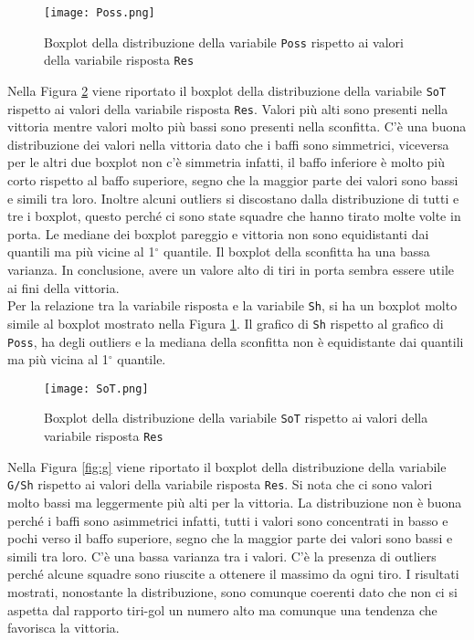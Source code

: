 \begin{figure}[htbp]
	\begin{center}
		\texttt{[image: Poss.png]}
		\caption{Boxplot della distribuzione della variabile \texttt{Poss} rispetto ai valori della variabile risposta \texttt{Res}} \label{fig:Poss}
	\end{center}
\end{figure}

Nella Figura \ref{fig:sot} viene riportato il boxplot della distribuzione della variabile \texttt{SoT} rispetto ai valori della variabile risposta \texttt{Res}. Valori più alti sono presenti nella vittoria mentre valori molto più bassi sono presenti nella sconfitta. C'è una buona distribuzione dei valori nella vittoria dato che i baffi sono simmetrici, viceversa per le altri due boxplot non c'è simmetria infatti, il baffo inferiore è molto più corto rispetto al baffo superiore, segno che la maggior parte dei valori sono bassi e simili tra loro. Inoltre alcuni outliers si discostano dalla distribuzione di tutti e tre i boxplot, questo perché ci sono state squadre che hanno tirato molte volte in porta. Le mediane dei boxplot pareggio e vittoria non sono equidistanti dai quantili ma più vicine al 1$^{\circ}$ quantile. Il boxplot della sconfitta ha una bassa varianza. In conclusione, avere un valore alto di tiri in porta sembra essere utile ai fini della vittoria.\\

Per la relazione tra la variabile risposta e la variabile \texttt{Sh}, si ha un boxplot molto simile al boxplot mostrato nella Figura \ref{fig:Poss}. Il grafico di \texttt{Sh} rispetto al grafico di \texttt{Poss}, ha degli outliers e la mediana della sconfitta non è equidistante dai quantili ma più vicina al 1$^{\circ}$ quantile.\\

\begin{figure}[htbp]
	\begin{center}
		\texttt{[image: SoT.png]}
		\caption{Boxplot della distribuzione della variabile \texttt{SoT} rispetto ai valori della variabile risposta \texttt{Res} } \label{fig:sot}
	\end{center}
\end{figure}

Nella Figura \ref{fig:g} viene riportato il boxplot della distribuzione della variabile \texttt{G/Sh} rispetto ai valori della variabile risposta \texttt{Res}. Si nota che ci sono valori molto bassi ma leggermente più alti per la vittoria. La distribuzione non è buona perché i baffi sono asimmetrici infatti, tutti i valori sono concentrati in basso e pochi verso il baffo superiore, segno che la maggior parte dei valori sono bassi e simili tra loro. C'è una bassa varianza tra i valori. C'è la presenza di outliers perché alcune squadre sono riuscite a ottenere il massimo da ogni tiro. I risultati mostrati, nonostante la distribuzione, sono comunque coerenti dato che non ci si aspetta dal rapporto tiri-gol un numero alto ma comunque una tendenza che favorisca la vittoria.\\

